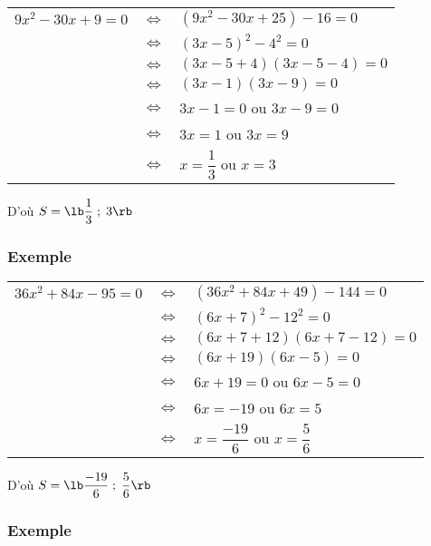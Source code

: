 \begin{tabular}{lll}
$9x^2 - 30x + 9 = 0$ & $\Longleftrightarrow$ & $\left(9x^2 - 30x +25\right) - 16 = 0 $ \\
& $\Longleftrightarrow$ & $\left(3x - 5\right)^2 - 4^2 = 0$ \\
& $\Longleftrightarrow$ & $\left(3x -5 + 4\right)\left(3x - 5 - 4\right) = 0$ \\
& $\Longleftrightarrow$ & $\left(3x -1\right)\left(3x - 9\right) = 0$ \\
& $\Longleftrightarrow$ & $ 3x - 1 = 0 $ ou $3x - 9 = 0$ \\
& $\Longleftrightarrow$ & $3x = 1 $ ou $3x = 9$ \\
& $ \Longleftrightarrow$ & $ x = \dfrac{1}{3} $ ou $x = 3$ \\
\end{tabular}

\vspace*{.3cm}

D'où $S = \lb \dfrac{1}{3} \; ; \; 3 \rb $ 

\subsubsection{Exemple }

\begin{tabular}{lll}
$36x^2 + 84x - 95 = 0 $ & $\Longleftrightarrow$ & $\left(36x^2 + 84x + 49\right) - 144 = 0 $ \\
& $\Longleftrightarrow$ & $\left(6x + 7\right)^2 - 12^2 = 0$ \\
& $\Longleftrightarrow$ & $\left(6x + 7 + 12\right)\left(6x + 7 - 12\right) = 0$ \\
& $\Longleftrightarrow$ & $\left(6x + 19\right)\left(6x -5\right) = 0$ \\
& $\Longleftrightarrow$ & $6x + 19 = 0$ ou $6x - 5 = 0$ \\
& $\Longleftrightarrow$ & $6x = -19$ ou $6x = 5$ \\
& $ \Longleftrightarrow$ & $x = \dfrac{-19}{6}$ ou $x = \dfrac{5}{6}$ \\
\end{tabular}

\vspace*{.3cm}

D'où $S = \lb \dfrac{-19}{6} \; ; \; \dfrac{5}{6} \rb $ 

\subsubsection{Exemple }

